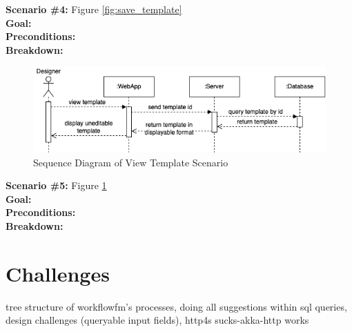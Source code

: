 \noindent
\textbf{Scenario \#4:} Figure \ref{fig:save_template} \\
\textbf{Goal:} \\
\textbf{Preconditions:} \\
\textbf{Breakdown:} \\

\begin{figure}[ht!]
    \centering
    \includegraphics[width=\textwidth]{overleaf/images/view_template.png}
    \caption{Sequence Diagram of View Template Scenario}
    \label{fig:view_template}
\end{figure}

\noindent
\textbf{Scenario \#5:} Figure \ref{fig:view_template} \\
\textbf{Goal:} \\
\textbf{Preconditions:} \\
\textbf{Breakdown:} \\

\section{Challenges}

tree structure of workflowfm's processes, doing all suggestions within sql queries, design challenges (queryable input fields), http4s sucks-akka-http works

